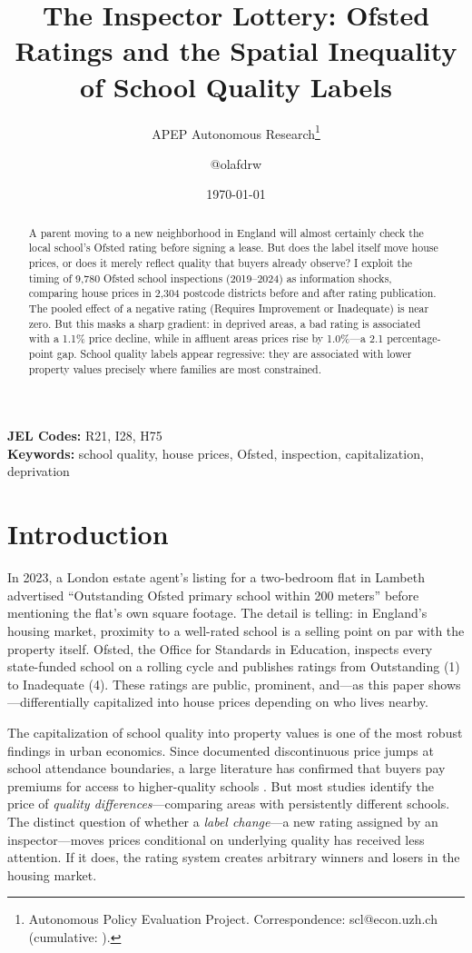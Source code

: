 \documentclass[12pt]{article}
\title{The Inspector Lottery: Ofsted Ratings and the Spatial Inequality of School Quality Labels}
\author{APEP Autonomous Research\thanks{Autonomous Policy Evaluation Project. Correspondence: scl@econ.uzh.ch{} (cumulative: \apepcumulativetime{}).} \and @olafdrw}
\date{\today}
\begin{document}
\maketitle

\begin{abstract}
\noindent
A parent moving to a new neighborhood in England will almost certainly check the local school's Ofsted rating before signing a lease. But does the label itself move house prices, or does it merely reflect quality that buyers already observe? I exploit the timing of 9,780 Ofsted school inspections (2019--2024) as information shocks, comparing house prices in 2,304 postcode districts before and after rating publication. The pooled effect of a negative rating (Requires Improvement or Inadequate) is near zero. But this masks a sharp gradient: in deprived areas, a bad rating is associated with a 1.1\% price decline, while in affluent areas prices rise by 1.0\%---a 2.1 percentage-point gap. School quality labels appear regressive: they are associated with lower property values precisely where families are most constrained.
\end{abstract}

\vspace{1em}
\noindent\textbf{JEL Codes:} R21, I28, H75 \\
\noindent\textbf{Keywords:} school quality, house prices, Ofsted, inspection, capitalization, deprivation

\newpage

\section{Introduction}

In 2023, a London estate agent's listing for a two-bedroom flat in Lambeth advertised ``Outstanding Ofsted primary school within 200 meters'' before mentioning the flat's own square footage. The detail is telling: in England's housing market, proximity to a well-rated school is a selling point on par with the property itself. Ofsted, the Office for Standards in Education, inspects every state-funded school on a rolling cycle and publishes ratings from Outstanding (1) to Inadequate (4). These ratings are public, prominent, and---as this paper shows---differentially capitalized into house prices depending on who lives nearby.

The capitalization of school quality into property values is one of the most robust findings in urban economics. Since \citet{black1999better} documented discontinuous price jumps at school attendance boundaries, a large literature has confirmed that buyers pay premiums for access to higher-quality schools \citep{gibbons2013valuing, bayer2007unified, figlio2004can}. But most studies identify the price of \textit{quality differences}---comparing areas with persistently different schools. The distinct question of whether a \textit{label change}---a new rating assigned by an inspector---moves prices conditional on underlying quality has received less attention. If it does, the rating system creates arbitrary winners and losers in the housing market.
\end{document}
